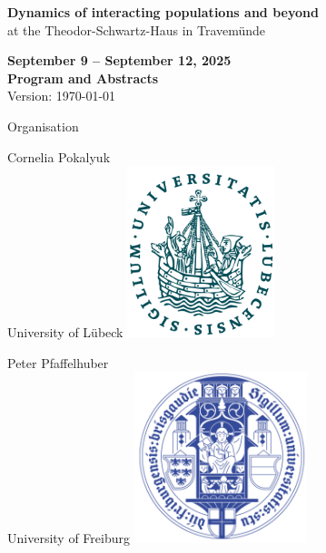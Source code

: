\documentclass[12pt,a4paper]{article}
\begin{document}
\sffamily 

\thispagestyle{empty}

\begin{center}
\vspace*{1cm}
\addtolength{\textheight}{3.5cm}

{\huge 
\textbf{Dynamics of interacting populations and beyond\\[2ex]
 }} at the Theodor-Schwartz-Haus in Travemünde
\bigskip\bigskip

\textbf{\large September 9 -- September 12, 2025}\\[4ex]
\textbf{\large Program and Abstracts}\\[4ex]
Version: \today
\vfill

{Organisation}\\[1.0ex]

\bigskip
\bigskip
\bigskip
\begin{minipage}[c]{.39\textwidth} 
{\bigskip
\begin{center}
Cornelia Pokalyuk \\
University of Lübeck
\vspace*{1cm}
\includegraphics[height=5cm]{Siegel-Uni-Luebeck.svg.png}\\
\end{center}}
\end{minipage}
\hfill
\begin{minipage}[c]{.39\textwidth} 
{\bigskip
\begin{center}%
Peter Pfaffelhuber\\
University of Freiburg
\vspace*{1cm}
{\includegraphics[height=5cm]{UFR-vorlage-designsystem-typo-farben-V1.99-768x543.png}}\\
\end{center}}
\end{minipage}
\end{center}
\end{document}
